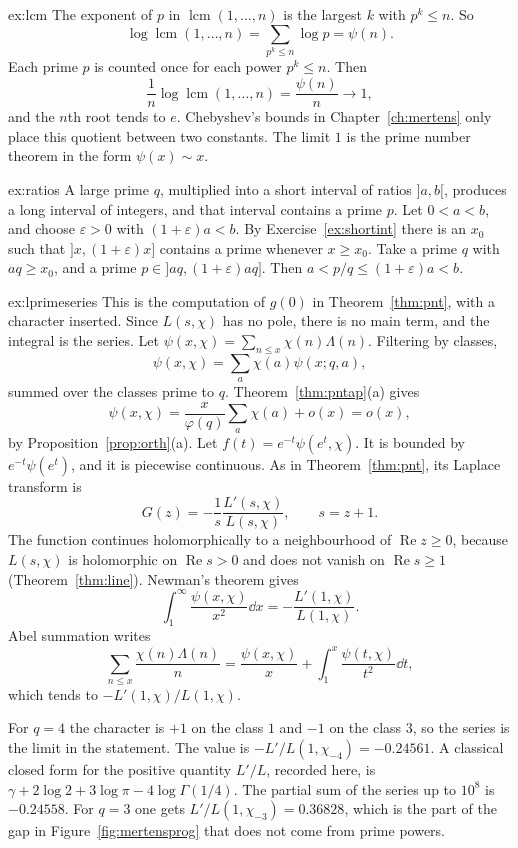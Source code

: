 \begin{solution}{ex:lcm}
\idea The exponent of $p$ in $\operatorname{lcm}(1,\dots,n)$ is the largest $k$ with $p^k\le n$.
\writeup So
\[
\log\operatorname{lcm}(1,\dots,n)=\sum_{p^k\le n}\log p=\psi(n).
\]
Each prime $p$ is counted once for each power $p^k\le n$. Then
\[
\frac1n\log\operatorname{lcm}(1,\dots,n)=\frac{\psi(n)}n\to1,
\]
and the $n$th root tends to $e$. Chebyshev's bounds in Chapter~\ref{ch:mertens} only place this quotient between two constants. The limit $1$ is the prime number theorem in the form $\psi(x)\sim x$.
\end{solution}

\begin{solution}{ex:ratios}
\idea A large prime $q$, multiplied into a short interval of ratios $]a,b[$, produces a long interval of integers, and that interval contains a prime $p$.
\writeup Let $0<a<b$, and choose $\varepsilon>0$ with $(1+\varepsilon)a<b$. By Exercise~\ref{ex:shortint} there is an $x_0$ such that $]x,(1+\varepsilon)x]$ contains a prime whenever $x\ge x_0$. Take a prime $q$ with $aq\ge x_0$, and a prime $p\in]aq,(1+\varepsilon)aq]$. Then $a<p/q\le(1+\varepsilon)a<b$.
\end{solution}

\begin{solution}{ex:lprimeseries}
\idea This is the computation of $g(0)$ in Theorem~\ref{thm:pnt}, with a character inserted. Since $L(s,\chi)$ has no pole, there is no main term, and the integral is the series.
\writeup Let $\psi(x,\chi)=\sum_{n\le x}\chi(n)\Lambda(n)$. Filtering by classes,
\[
\psi(x,\chi)=\sum_a\chi(a)\psi(x;q,a),
\]
summed over the classes prime to $q$. Theorem~\ref{thm:pntap}(a) gives
\[
\psi(x,\chi)=\frac x{\varphi(q)}\sum_a\chi(a)+o(x)=o(x),
\]
by Proposition~\ref{prop:orth}(a). Let $f(t)=e^{-t}\psi(e^t,\chi)$. It is bounded by $e^{-t}\psi(e^t)$, and it is piecewise continuous. As in Theorem~\ref{thm:pnt}, its Laplace transform is
\[
G(z)=-\frac1s\frac{L'(s,\chi)}{L(s,\chi)},\qquad s=z+1.
\]
The function continues holomorphically to a neighbourhood of $\operatorname{Re}z\ge0$, because $L(s,\chi)$ is holomorphic on $\operatorname{Re}s>0$ and does not vanish on $\operatorname{Re}s\ge1$ (Theorem~\ref{thm:line}). Newman's theorem gives
\[
\int_1^\infty\frac{\psi(x,\chi)}{x^2}\dd x=-\frac{L'(1,\chi)}{L(1,\chi)}.
\]
Abel summation writes
\[
\sum_{n\le x}\frac{\chi(n)\Lambda(n)}n=\frac{\psi(x,\chi)}x+\int_1^x\frac{\psi(t,\chi)}{t^2}\dd t,
\]
which tends to $-L'(1,\chi)/L(1,\chi)$.

For $q=4$ the character is $+1$ on the class $1$ and $-1$ on the class $3$, so the series is the limit in the statement. The value is $-L'/L(1,\chi_{-4})=-0.24561$. A classical closed form for the positive quantity $L'/L$, recorded here, is $\gamma+2\log2+3\log\pi-4\log\Gamma(1/4)$. The partial sum of the series up to $10^8$ is $-0.24558$. For $q=3$ one gets $L'/L(1,\chi_{-3})=0.36828$, which is the part of the gap in Figure~\ref{fig:mertensprog} that does not come from prime powers.
\end{solution}

